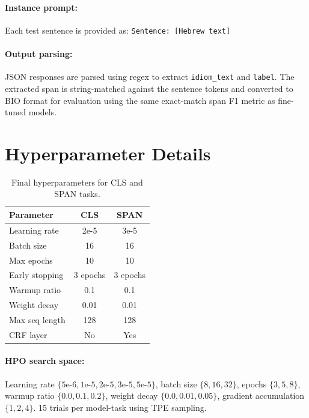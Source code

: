 \documentclass[11pt]{article}
\begin{document}
\paragraph{Instance prompt:} Each test sentence is provided as: \texttt{Sentence: [Hebrew text]}

\paragraph{Output parsing:} JSON responses are parsed using regex to extract \texttt{idiom\_text} and \texttt{label}. The extracted span is string-matched against the sentence tokens and converted to BIO format for evaluation using the same exact-match span F1 metric as fine-tuned models.

\section{Hyperparameter Details}
\label{sec:appendix_hpo}

\begin{table}[h]
\centering
\small
\begin{tabular}{lcc}
\toprule
\textbf{Parameter} & \textbf{CLS} & \textbf{SPAN} \\
\midrule
Learning rate & 2e-5 & 3e-5 \\
Batch size & 16 & 16 \\
Max epochs & 10 & 10 \\
Early stopping & 3 epochs & 3 epochs \\
Warmup ratio & 0.1 & 0.1 \\
Weight decay & 0.01 & 0.01 \\
Max seq length & 128 & 128 \\
CRF layer & No & Yes \\
\bottomrule
\end{tabular}
\caption{Final hyperparameters for CLS and SPAN tasks.}
\label{tab:hyperparams}
\end{table}

\paragraph{HPO search space:} Learning rate $\{5\text{e-}6, 1\text{e-}5, 2\text{e-}5, 3\text{e-}5, 5\text{e-}5\}$, batch size $\{8, 16, 32\}$, epochs $\{3, 5, 8\}$, warmup ratio $\{0.0, 0.1, 0.2\}$, weight decay $\{0.0, 0.01, 0.05\}$, gradient accumulation $\{1, 2, 4\}$. 15 trials per model-task using TPE sampling.
\end{document}
